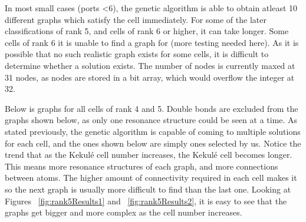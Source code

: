 \documentclass[12pt]{article}
\begin{document}
In most small cases (ports \textless 6), the genetic algorithm is able to obtain atleast 10 different graphs which satisfy the cell immediately. For some of the later classifications of rank 5, and cells of rank 6 or higher, it can take longer. Some cells of rank 6 it is unable to find a graph for (more testing needed here). As it is possible that no such realistic graph exists for some cells, it is difficult to determine whether a solution exists. The number of nodes is currently maxed at 31 nodes, as nodes are stored in a bit array, which would overflow the integer at 32.

Below is graphs for all cells of rank 4 and 5. Double bonds are excluded from the graphs shown below, as only one resonance structure could be seen at a time. As stated previously, the genetic algorithm is capable of coming to multiple solutions for each cell, and the ones shown below are simply ones selected by us. Notice the trend that as the Kekul\'e cell number increases, the Kekul\'e cell becomes longer. This means more resonance structures of each graph, and more connections between atoms. The higher amount of connectivity required in each cell makes it so the next graph is usually more difficult to find than the last one. Looking at Figures ~\ref{fig:rank5Results1} and ~\ref{fig:rank5Results2}, it is easy to see that the graphs get bigger and more complex as the cell number increases. 
\end{document}
